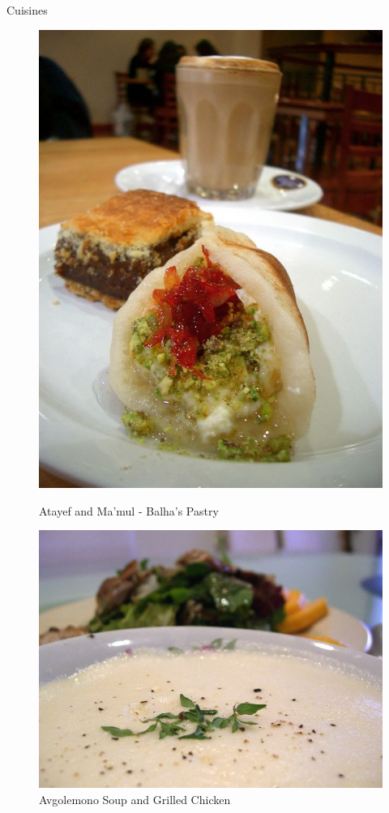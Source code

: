 \documentclass{beamer}
\begin{document}
	\begin{frame}{Cuisines}
	
	\begin{figure}[h]
		\centering
		\begin{minipage}{0.4\textwidth}
			\centering
			\includegraphics[width=0.5\linewidth]{photo1.jpg}
			\caption{Atayef and Ma'mul - Balha's Pastry}
		\end{minipage}\hfill
		\begin{minipage}{0.45\textwidth}
			\centering
			\includegraphics[width=0.7\linewidth]{photo2.jpg}
			\caption{Avgolemono Soup and Grilled Chicken}
		\end{minipage}
	

\end{figure}
\end{frame}
\end{document}
